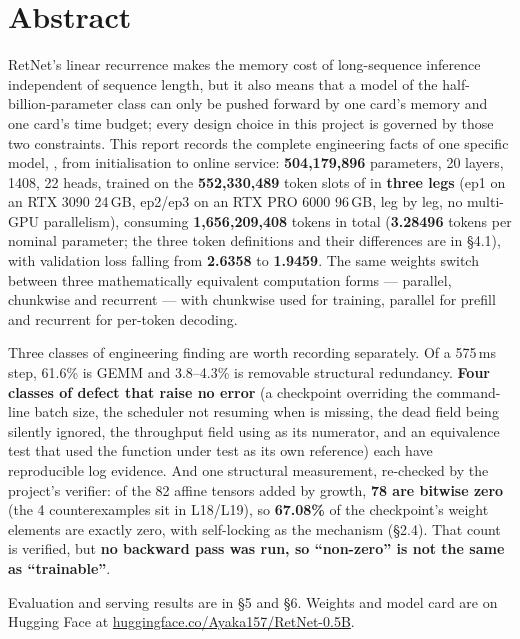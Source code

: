 \clearpage

\section*{Abstract}

RetNet's linear recurrence makes the memory cost of long-sequence inference independent of
sequence length, but it also means that a model of the half-billion-parameter class can only be
pushed forward by one card's memory and one card's time budget; every design choice in this
project is governed by those two constraints. This report records the complete engineering facts
of one specific model, , from initialisation to online
service: \textbf{504{,}179{,}896} parameters, 20 layers,  1408, 22 heads, trained
on the \textbf{552{,}330{,}489} token slots of  in \textbf{three
legs} (ep1 on an RTX 3090 24\,GB, ep2/ep3 on an RTX PRO 6000 96\,GB, leg by leg, no multi-GPU
parallelism), consuming \textbf{1{,}656{,}209{,}408} tokens in total (\textbf{3.28496} tokens per
nominal parameter; the three token definitions and their differences are in \S4.1), with
validation loss falling from \textbf{2.6358} to \textbf{1.9459}. The same weights switch between
three mathematically equivalent computation forms --- parallel, chunkwise and recurrent --- with
chunkwise used for training, parallel for prefill and recurrent for per-token decoding.

Three classes of engineering finding are worth recording separately. Of a 575\,ms step, 61.6\% is
GEMM and 3.8--4.3\% is removable structural redundancy. \textbf{Four classes of defect that raise
no error} (a checkpoint overriding the command-line batch size, the scheduler not resuming when
 is missing, the dead  field being silently ignored, the
throughput field using  as its numerator, and an equivalence test that used the
function under test as its own reference) each have reproducible log evidence. And one structural
measurement, re-checked by the project's verifier: of the 82 affine tensors added by growth,
\textbf{78 are bitwise zero} (the 4 counterexamples sit in L18/L19), so \textbf{67.08\%} of the
checkpoint's weight elements are exactly zero, with  self-locking as the
mechanism (\S2.4). That count is verified, but \textbf{no backward pass was run, so ``non-zero''
is not the same as ``trainable''}.

Evaluation and serving results are in \S5 and \S6. Weights and model card are on Hugging Face at
\href{https://huggingface.co/Ayaka157/RetNet-0.5B}{huggingface.co/Ayaka157/RetNet-0.5B}.

\clearpage

\renewcommand{\contentsname}{Contents}
\tableofcontents

\clearpage
